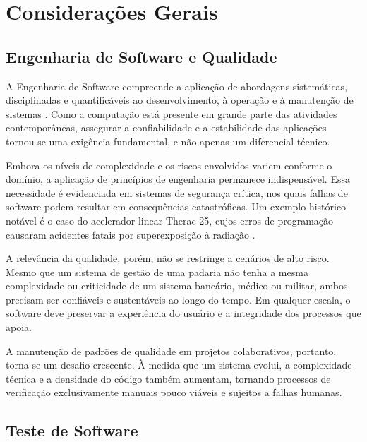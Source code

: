 \chapter{Considerações Gerais}
\label{cap:02}

\section{Engenharia de Software e Qualidade}

A Engenharia de Software compreende a aplicação de abordagens sistemáticas, disciplinadas e quantificáveis ao desenvolvimento, à operação e à manutenção de sistemas . Como a computação está presente em grande parte das atividades contemporâneas, assegurar a confiabilidade e a estabilidade das aplicações tornou-se uma exigência fundamental, e não apenas um diferencial técnico.

Embora os níveis de complexidade e os riscos envolvidos variem conforme o domínio, a aplicação de princípios de engenharia permanece indispensável. Essa necessidade é evidenciada em sistemas de segurança crítica, nos quais falhas de software podem resultar em consequências catastróficas. Um exemplo histórico notável é o caso do acelerador linear Therac-25, cujos erros de programação causaram acidentes fatais por superexposição à radiação .

A relevância da qualidade, porém, não se restringe a cenários de alto risco. Mesmo que um sistema de gestão de uma padaria não tenha a mesma complexidade ou criticidade de um sistema bancário, médico ou militar, ambos precisam ser confiáveis e sustentáveis ao longo do tempo. Em qualquer escala, o software deve preservar a experiência do usuário e a integridade dos processos que apoia.

A manutenção de padrões de qualidade em projetos colaborativos, portanto, torna-se um desafio crescente. À medida que um sistema evolui, a complexidade técnica e a densidade do código também aumentam, tornando processos de verificação exclusivamente manuais pouco viáveis e sujeitos a falhas humanas.

\section{Teste de Software}

